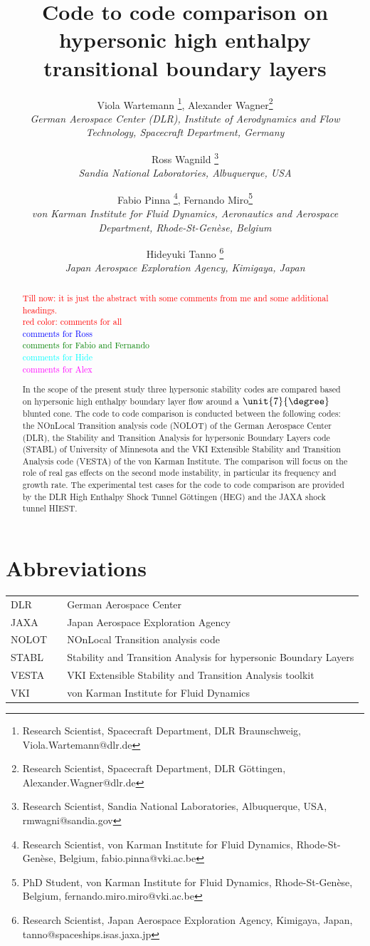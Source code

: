 \documentclass[]{aiaa-tc}%
\title{Code to code comparison on hypersonic high enthalpy transitional boundary layers}
\author{
  Viola Wartemann%
  \thanks{Research Scientist, Spacecraft Department, DLR Braunschweig, Viola.Wartemann@dlr.de}, Alexander Wagner\thanks{Research Scientist, Spacecraft Department, DLR G\"ottingen, Alexander.Wagner@dlr.de}\\
  {\normalsize\itshape
  German Aerospace Center (DLR), Institute of Aerodynamics and Flow Technology, Spacecraft Department, Germany} \\
  \and
  Ross Wagnild%
    \thanks{Research Scientist, Sandia National Laboratories, Albuquerque, USA, rmwagni@sandia.gov} \\
{\normalsize\itshape
  Sandia National Laboratories, Albuquerque, USA} \\
  \and
  Fabio Pinna%
    \thanks{Research Scientist, von Karman Institute for Fluid Dynamics, Rhode-St-Genèse, Belgium, fabio.pinna@vki.ac.be}, Fernando Miro\thanks{PhD Student, von Karman Institute for Fluid Dynamics, Rhode-St-Genèse, Belgium, fernando.miro.miro@vki.ac.be} \\   
{\normalsize\itshape
  von Karman Institute for Fluid Dynamics, Aeronautics and Aerospace Department, Rhode-St-Genèse, Belgium} \\
  \and
  Hideyuki Tanno%
    \thanks{Research Scientist, Japan Aerospace Exploration Agency, Kimigaya, Japan, tanno@spaceships.isas.jaxa.jp} \\
{\normalsize\itshape
 Japan Aerospace Exploration Agency, Kimigaya, Japan} \\
}
\begin{document}
\maketitle


\begin{abstract}

\textcolor{red}{Till now: it is just the abstract with some comments from me and some additional headings. \\ red color: comments for all}\\
\textcolor{blue}{comments for Ross}\\
\textcolor{green}{comments for Fabio and Fernando}\\
\textcolor{cyan}{comments for Hide}\\
\textcolor{magenta}{comments for Alex}

In the scope of the present study three hypersonic stability codes are compared based on hypersonic high enthalpy boundary layer flow around a $\unit{7}{\degree}$ blunted cone. The code to code comparison is conducted between the following codes: the  NOnLocal Transition analysis code (NOLOT) of the German Aerospace Center (DLR), the Stability and Transition Analysis for hypersonic Boundary Layers code (STABL) of University of Minnesota and the VKI Extensible Stability and Transition Analysis code (VESTA) of the von Karman Institute. The comparison will focus on the role of real gas effects on the second mode instability, in particular its frequency and growth rate. The experimental test cases for the code to code comparison are provided by the DLR High Enthalpy Shock Tunnel G\"ottingen (HEG) and the JAXA shock tunnel HIEST.  

\end{abstract}


\section*{Abbreviations}
\begin{tabular}{lll}
DLR   &    &  German Aerospace Center \\
JAXA & &  Japan Aerospace Exploration Agency\\
NOLOT & & NOnLocal Transition analysis code\\
STABL & & Stability and Transition Analysis for hypersonic Boundary Layers\\
VESTA & & VKI Extensible Stability and Transition Analysis toolkit \\
VKI & &  von Karman Institute for Fluid Dynamics\\

\end{tabular}
\end{document}
